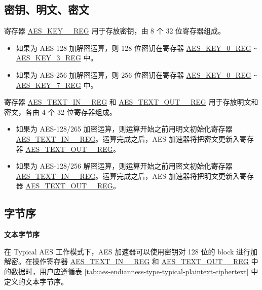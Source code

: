 \documentclass[main\_\_CN.tex]{subfiles}
\begin{document}
\subsection{密钥、明文、密文}

寄存器 \hyperref[regdesc:AESKEYnREG]{AES\_KEY\_\_REG} 用于存放密钥，由 8 个 32 位寄存器组成。

\begin{itemize}
    \item 如果为 AES-128 加解密运算，则 128 位密钥在寄存器 \hyperref[regdesc:AESKEYnREG]{AES\_KEY\_0\_REG} \verb+~+ \hyperref[regdesc:AESKEYnREG]{AES\_KEY\_3\_REG} 中。
    \item 如果为 AES-256 加解密运算，则 256 位密钥在寄存器 \hyperref[regdesc:AESKEYnREG]{AES\_KEY\_0\_REG} \verb+~+ \hyperref[regdesc:AESKEYnREG]{AES\_KEY\_7\_REG} 中。
\end{itemize}

寄存器 \hyperref[regdesc:AESTEXTINnREG]{AES\_TEXT\_IN\_\_REG} 和 \hyperref[regdesc:AESTEXTOUTnREG]{AES\_TEXT\_OUT\_\_REG} 用于存放明文和密文，各由 4 个 32 位寄存器组成。

\begin{itemize}
    \item 如果为 AES-128/265 加密运算，则运算开始之前用明文初始化寄存器 \hyperref[regdesc:AESTEXTINnREG]{AES\_TEXT\_IN\_\_REG}。运算完成之后，AES 加速器将把密文更新入寄存器 \hyperref[regdesc:AESTEXTOUTnREG]{AES\_TEXT\_OUT\_\_REG}。
    \item 如果为 AES-128/256 解密运算，则运算开始之前用密文初始化寄存器 \hyperref[regdesc:AESTEXTINnREG]{AES\_TEXT\_IN\_\_REG}。运算完成之后，AES 加速器将把明文更新入寄存器 \hyperref[regdesc:AESTEXTOUTnREG]{AES\_TEXT\_OUT\_\_REG}。
\end{itemize}

\subsection{字节序}

\textbf{文本字节序}

在 Typical AES 工作模式下，AES 加速器可以使用密钥对 128 位的 block 进行加解密。在操作寄存器 \hyperref[regdesc:AESTEXTINnREG]{AES\_TEXT\_IN\_\_REG} 和 \hyperref[regdesc:AESTEXTINnREG]{AES\_TEXT\_OUT\_\_REG} 中的数据时，用户应遵循表 \ref{tab:aes-endianness-type-typical-plaintext-ciphertext} 中定义的文本字节序。
\end{document}

